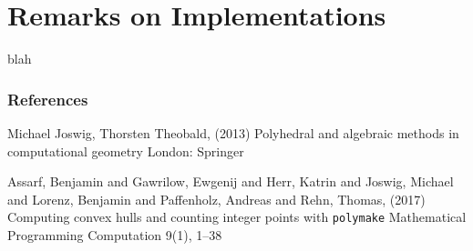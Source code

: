 \documentclass[9pt]{beamer}
\theoremstyle{definition}
\begin{document}


\section{Remarks on Implementations}

\begin{frame}[fragile]{}
  blah
\end{frame}


\begin{frame}
  \frametitle{References}
  \footnotesize{
    \begin{thebibliography}{99} %
     Michael Joswig, Thorsten Theobald, (2013)
      \newblock Polyhedral and algebraic methods in computational geometry
      \newblock London: Springer

     Assarf, Benjamin and Gawrilow, Ewgenij and Herr, Katrin and Joswig, Michael and Lorenz, Benjamin and Paffenholz, Andreas and Rehn, Thomas, (2017)
      \newblock Computing convex hulls and counting integer points with \texttt{polymake}
      \newblock Mathematical Programming Computation 9(1), 1--38 



  \end{thebibliography}
  }
\end{frame}

\end{document}
